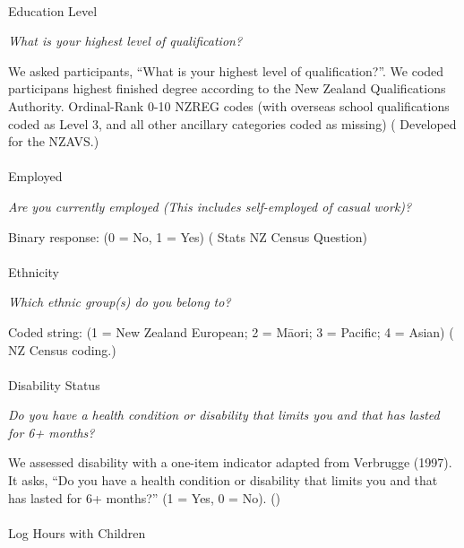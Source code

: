 \documentclass[
  single column]{article}
\makeatletter
\let\oldparagraph\paragraph
\renewcommand{\paragraph}{
    \@ifstar
      \xxxParagraphStar
      \xxxParagraphNoStar
  }
\newcommand{\xxxParagraphStar}[1]{\oldparagraph*{#1}\mbox{}}
\newcommand{\xxxParagraphNoStar}[1]{\oldparagraph{#1}\mbox{}}
\makeatother
\begin{document}
\paragraph{Education Level}\label{education-level}

\emph{What is your highest level of qualification?}

We asked participants, ``What is your highest level of qualification?''.
We coded participans highest finished degree according to the New
Zealand Qualifications Authority. Ordinal-Rank 0-10 NZREG codes (with
overseas school qualifications coded as Level 3, and all other ancillary
categories coded as missing)
( Developed for the
NZAVS.)

\paragraph{Employed}\label{employed}

\emph{Are you currently employed (This includes self-employed of casual
work)?}

Binary response: (0 = No, 1 = Yes)
( Stats NZ Census
Question)

\paragraph{Ethnicity}\label{ethnicity}

\emph{Which ethnic group(s) do you belong to?}

Coded string: (1 = New Zealand European; 2 = Māori; 3 = Pacific; 4 =
Asian) ( NZ Census
coding.)

\paragraph{Disability Status}\label{disability-status}

\emph{Do you have a health condition or disability that limits you and
that has lasted for 6+ months?}

We assessed disability with a one-item indicator adapted from Verbrugge
(1997). It asks, ``Do you have a health condition or disability that
limits you and that has lasted for 6+ months?'' (1 = Yes, 0 = No).
()

\paragraph{Log Hours with Children}\label{log-hours-with-children}
\end{document}
